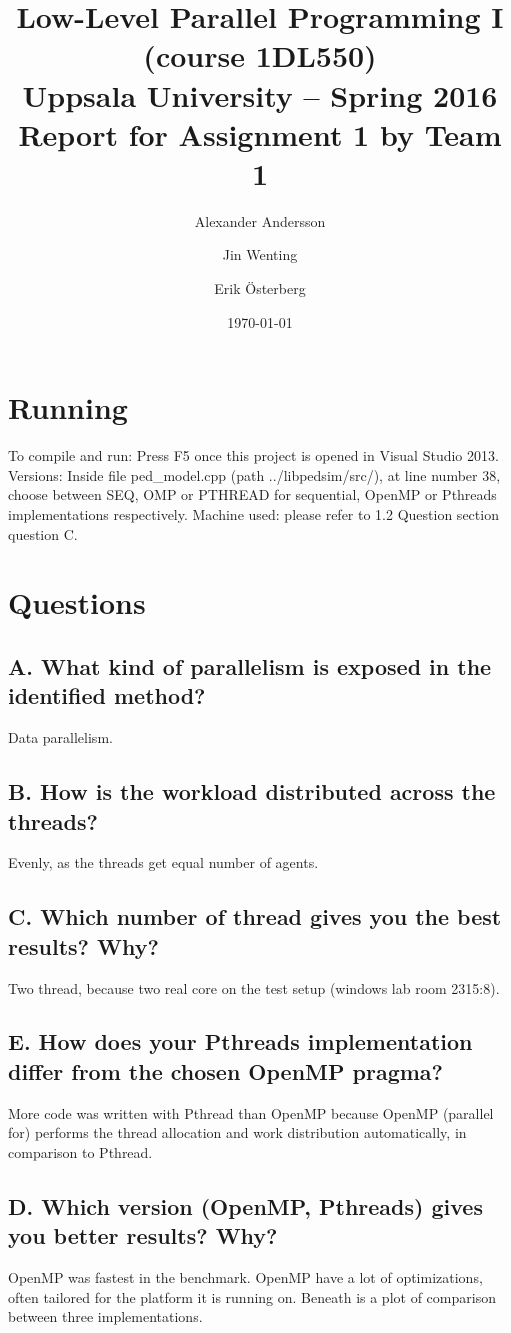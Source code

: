 \documentclass[a4paper,11pt]{article}
\title{\textbf{Low-Level Parallel Programming I (course 1DL550) \\
    Uppsala University -- Spring 2016 \\
    Report for Assignment 1 by Team 1
  }
}
\author{Alexander Andersson \and Jin Wenting \and Erik Österberg}
\date{\today}
\begin{document}
\maketitle
\section{Running}
To compile and run: Press F5 once this project is opened in Visual Studio 2013.
Versions: Inside file ped\_model.cpp (path ../libpedsim/src/), at line number 38,
choose between SEQ, OMP or PTHREAD for sequential, OpenMP or Pthreads
implementations respectively.
Machine used: please refer to 1.2 Question section question C.

\section{Questions}
\subsection{A. What kind of parallelism is exposed in the identified method?}
Data parallelism.
\subsection{B. How is the workload distributed across the threads?}
Evenly, as the threads get equal number of agents.
\subsection{C. Which number of thread gives you the best results? Why?}
Two thread, because two real core on the test setup (windows lab room 2315:8).
\subsection{E. How does your Pthreads implementation differ from the chosen OpenMP pragma?}
More code was written with Pthread than OpenMP because OpenMP (parallel for)
performs the thread allocation and work distribution automatically, in comparison to
Pthread.
\subsection{D. Which version (OpenMP, Pthreads) gives you better results? Why?}
OpenMP was fastest in the benchmark.
OpenMP have a lot of optimizations, often tailored for the platform it is running on.
Beneath is a plot of comparison between three implementations.
\end{document}
